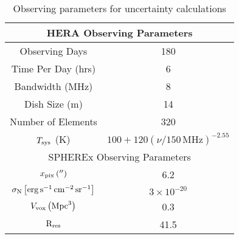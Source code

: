 \begin{table}[]
\caption{Observing parameters for uncertainty calculations}
\centering
\begin{tabular}{cc}
\hline
\multicolumn{2}{c}{HERA Observing Parameters}                                                                                                                \\ \hline
\multicolumn{1}{c|}{Observing Days}                                                         & 180                                                            \\
\multicolumn{1}{c|}{Time Per Day (hrs)}                                                     & 6                                                              \\
\multicolumn{1}{c|}{Bandwidth (MHz)}                                                        & 8                                                              \\
\multicolumn{1}{c|}{Dish Size (m)}                                                          & 14                                                             \\
\multicolumn{1}{c|}{Number of Elements}                                                     & 320                                                            \\
\multicolumn{1}{c|}{$T_{\rm sys}$  (K)}                                                          & $100 + 120 \left( \nu / 150 \, \textrm{MHz} \right)^{-2.55}$ \\ \hline
\multicolumn{2}{c}{SPHEREx Observing Parameters}                                                                                                             \\ \hline
\multicolumn{1}{c|}{$x_{\rm pix} \left( '' \right)$}                                        & 6.2                                                            \\
\multicolumn{1}{c|}{$\sigma_{\rm N} \left[ \rm erg \, s^{-1} \, cm^{-2} \, sr^{-1}\right]$} & $3 \times 10^{-20}$                                            \\
\multicolumn{1}{c|}{$V_{\rm vox} \left(\textrm{Mpc}^{3} \right)$}                                         & 0.3                                                            \\
\multicolumn{1}{c|}{$\textrm{R}_{\rm res}$}                                                 & 41.5                                                           \\ \hline
\end{tabular}
\label{tab:obs_table}
\end{table}


